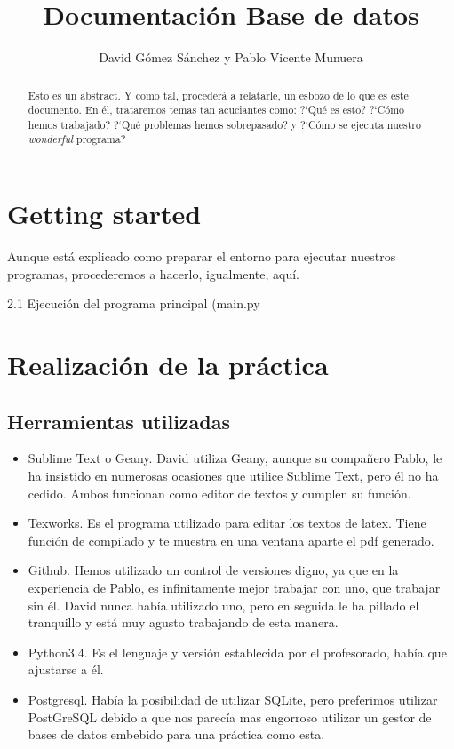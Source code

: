 \documentclass[11pt]{article} %
\title{Documentaci\'on Base de datos}
\author{David G\'omez S\'anchez y Pablo Vicente Munuera}
\date{} %
\begin{document}
\maketitle

\begin{abstract}

Esto es un abstract. Y como tal, proceder\'a a relatarle, un esbozo de lo que es este documento. En él, trataremos temas tan acuciantes como: ?`Qu\'e es esto? ?`C\'omo hemos trabajado? ?`Qu\'e problemas hemos sobrepasado? y ?`C\'omo se ejecuta nuestro \emph{wonderful} programa?

\end{abstract}


\section{Getting started}

Aunque est\'a explicado como preparar el entorno para ejecutar nuestros programas, procederemos a hacerlo, igualmente, aqu\'i.

2.1 Ejecución del programa principal (main.py

\section{Realizaci\'on de la pr\'actica}

\subsection{Herramientas utilizadas}

\begin{itemize}

\item Sublime Text o Geany. David utiliza Geany, aunque su compa\~nero Pablo, le ha insistido en numerosas ocasiones que utilice Sublime Text, pero \'el no ha cedido. Ambos funcionan como editor de textos y cumplen su funci\'on.

\item Texworks. Es el programa utilizado para editar los textos de latex. Tiene funci\'on de compilado y te muestra en una ventana aparte el pdf generado.

\item Github. Hemos utilizado un control de versiones digno, ya que en la experiencia de Pablo, es infinitamente mejor trabajar con uno, que trabajar sin \'el. David nunca hab\'ia utilizado uno, pero en seguida le ha pillado el tranquillo y est\'a muy agusto trabajando de esta manera.

\item Python3.4. Es el lenguaje y versi\'on establecida por el profesorado, hab\'ia que ajustarse a \'el.

\item Postgresql. Hab\'ia la posibilidad de utilizar SQLite, pero preferimos utilizar PostGreSQL debido a que nos parecía mas engorroso utilizar un gestor de bases de datos embebido para una práctica como esta.

\end{itemize}
\end{document}
